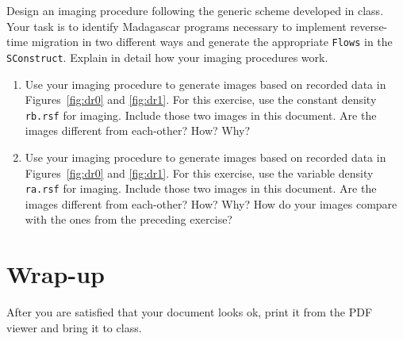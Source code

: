 Design an imaging procedure following the generic scheme developed in
class. Your task is to identify Madagascar programs necessary to
implement reverse-time migration in two different ways and generate
the appropriate \texttt{Flows} in the \texttt{SConstruct}. Explain in
detail how your imaging procedures work. 

\begin{enumerate}
\item Use your imaging procedure to generate images based on recorded
  data in Figures~\ref{fig:dr0} and \ref{fig:dr1}. For this exercise,
  use the constant density \texttt{rb.rsf} for imaging. Include those
  two images in this document. Are the images different from
  each-other? How? Why?

\item Use your imaging procedure to generate images based on recorded
  data in Figures~\ref{fig:dr0} and \ref{fig:dr1}. For this exercise,
  use the variable density \texttt{ra.rsf} for imaging. Include those
  two images in this document. Are the images different from
  each-other? How? Why? How do your images compare with the ones from
  the preceding exercise?

\end{enumerate}

\section{Wrap-up}

After you are satisfied that your document looks ok, print it from the
PDF viewer and bring it to class.

\newpage
